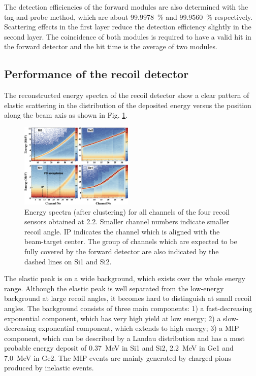 \documentclass[number,5p]{elsarticle}
\begin{document}
The detection efficiencies of the forward modules are also determined with the
tag-and-probe method, which are about \SI{99.9978}{\percent} and \SI{99.9560}{\percent} respectively.
Scattering effects in the first layer reduce the detection efficiency slightly in the second layer.
The coincidence of both modules is required to have a valid hit in the
forward detector and the hit time is the average of two modules.

\subsection{Performance of the recoil detector}
\label{sec:recoil_performance}
The reconstructed energy spectra of the recoil detector show a clear pattern
of elastic scattering in the distribution of the deposited energy versus the
position along the beam axis as shown in Fig. \ref{fig:e_map}.
\begin{figure}[tb!]
  \centering
  \includegraphics[width=0.48\textwidth]{./e_map.png}
  \caption{Energy spectra (after clustering) for all channels of the four recoil sensors obtained at \SI{2.2}{\momentum}.
    Smaller channel numbers indicate smaller recoil angle.
    IP indicates the channel which is aligned with
    the beam-target center.
    The group of channels which are expected to be fully covered by the forward detector are
    also indicated by the dashed lines on Si1 and Si2.
  }
  \label{fig:e_map}
\end{figure}
The elastic peak is on a wide background, which exists over the whole energy range.
Although the elastic peak is well separated from the low-energy background at
large recoil angles, it becomes hard to distinguish at small recoil angles.
The background consists of three main components:
1) a fast-decreasing exponential component, which has very high yield at low energy;
2) a slow-decreasing exponential component, which extends to high energy;
3) a MIP component, which can be described by a Landau distribution and has a most probable energy deposit of \SI{0.37}{\MeV} in Si1 and Si2, \SI{2.2}{\MeV} in Ge1 and \SI{7.0}{\MeV} in Ge2.
The MIP events are mainly generated by charged pions produced by inelastic events.
\end{document}
